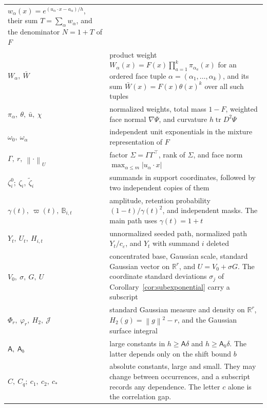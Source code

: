 \documentclass[11pt,letterpaper]{article}
\theoremstyle{remark}
\newcommand{\R}{\mathbb R}
\newcommand{\tr}{\operatorname{tr}}
\newcommand{\norm}[1]{\left\lVert#1\right\rVert}
\newcommand{\surf}{\mathcal J}
\begin{document}
\begin{longtable}{@{}p{}p{}@{}}
\(w_\alpha(x)=e^{(u_\alpha\cdot x-a_\alpha)/h}\), their sum
\(T=\sum_\alpha w_\alpha\), and the denominator \(N=1+T\) of \(F\)\\
\(W_\alpha,\ \bar W\) & product weight
\(W_\alpha(x)=F(x)\prod_{a=1}^k\pi_{\alpha_a}(x)\) for an ordered
face tuple \(\alpha=(\alpha_1,\ldots,\alpha_k)\), and its sum
\(\bar W(x)=F(x)\theta(x)^k\) over all such tuples\\
\(\pi_\alpha,\ \theta,\ \bar u,\ \chi\) & normalized weights, total
mass \(1-F\), weighted face normal \(\nabla\Psi\), and curvature
\(h\tr D^2\Psi\)\\
\(\omega_0,\ \omega_\alpha\) & independent unit exponentials in the
mixture representation of \(F\)\\
\(\Gamma,\ r,\ \norm\cdot_U\) & factor \(\Sigma=\Gamma\Gamma^\top\),
rank of \(\Sigma\), and face norm \(\max_{\alpha\le m}|u_\alpha\cdot x|\)\\
\(\zeta_i^0;\ \zeta_i,\ \widetilde\zeta_i\) & summands in support coordinates, followed by two
independent copies of them\\
\(\gamma(t),\ \varpi(t),\ \mathbb B_{i,t}\) & amplitude,
retention probability \((1-t)/\gamma(t)^2\), and independent masks.
The main path uses \(\gamma(t)=1+t\)\\
\(Y_t,\ U_t,\ H_{i,t}\) & unnormalized seeded path, normalized path
\(Y_t/c_\varepsilon\), and \(Y_t\) with summand \(i\) deleted\\
\(V_0,\ \sigma,\ G,\ U\) & concentrated base, Gaussian scale, standard
Gaussian vector on \(\R^r\), and \(U=V_0+\sigma G\). The coordinate
standard deviations \(\sigma_j\) of Corollary~\ref{cor:subexponential}
carry a subscript\\
\(\Phi_r,\ \varphi_r,\ H_2,\ \surf\) & standard Gaussian measure and
density on \(\R^r\), \(H_2(g)=\norm g^2-r\), and the Gaussian surface
integral\\
\(\mathsf A,\ \mathsf A_b\) & large constants in
\(h\ge\mathsf A\delta\) and \(h\ge\mathsf A_b\delta\).
The latter depends only on the shift bound \(b\)\\
\(C,\ C_q;\ c_1,\ c_2,\ c_*\) & absolute constants, large and small.
They may change between occurrences, and a subscript records any
dependence. The letter \(c\) alone is the correlation gap.\\
\end{longtable}
\endgroup
\end{document}
